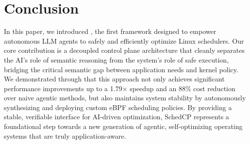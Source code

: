 \section{Conclusion}
\label{sec:conclusion}

In this paper, we introduced \sys, the first framework designed to empower autonomous LLM agents to safely and efficiently optimize Linux schedulers. Our core contribution is a decoupled control plane architecture that cleanly separates the AI's role of semantic reasoning from the system's role of safe execution, bridging the critical semantic gap between application needs and kernel policy. We demonstrated through \agent that this approach not only achieves significant performance improvements up to a 1.79× speedup and an 88\% cost reduction over naive agentic methods, but also maintains system stability by autonomously synthesizing and deploying custom eBPF scheduling policies. By providing a stable, verifiable interface for AI-driven optimization, SchedCP represents a foundational step towards a new generation of agentic, self-optimizing operating systems that are truly application-aware.







